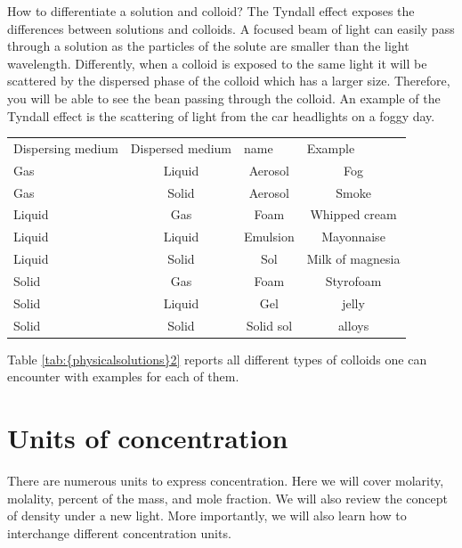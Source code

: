 \documentclass[main.tex]{subfiles}
\newcommand\chapterlabel{physicalsolutions}
\begin{document}
\begin{description}
How to differentiate a solution and colloid? The Tyndall effect exposes the differences between solutions and colloids. A focused beam of light can easily pass through a solution as the particles of the solute are smaller than the light wavelength. Differently, when a colloid is exposed to the same light it will be scattered by the dispersed phase of the colloid which has a larger size. Therefore, you will be able to see the bean passing through the colloid. An example of the Tyndall effect is the scattering of light from the car headlights on a foggy day.
 \begin{center}
  \label{tab:{\chapterlabel}2}
\selectfont
\begin{tabular}{llll}
\rowcolor{black!45}
\toprule
\multicolumn{4}{l}{\hypersetup{colorlinks,linkcolor={white}} \cellcolor{black}\color{white}\bfseries\small Table \ref{tab:{\chapterlabel}2} Types of colloids } \\
\midrule
 \rowcolor{gray!10} Dispersing medium & Dispersed medium& name & Example\\
\midrule
Gas	& \multicolumn{1}{c}{Liquid}&\multicolumn{1}{c}{Aerosol} &\multicolumn{1}{c}{Fog} \\ 
 Gas	& \multicolumn{1}{c}{Solid}&\multicolumn{1}{c}{Aerosol} &\multicolumn{1}{c}{Smoke} \\ 
Liquid	& \multicolumn{1}{c}{Gas}&\multicolumn{1}{c}{Foam} &\multicolumn{1}{c}{Whipped cream} \\ 
Liquid	& \multicolumn{1}{c}{Liquid}&\multicolumn{1}{c}{Emulsion} &\multicolumn{1}{c}{Mayonnaise} \\ 
Liquid	& \multicolumn{1}{c}{Solid}&\multicolumn{1}{c}{Sol} &\multicolumn{1}{c}{Milk of magnesia} \\ 
Solid	& \multicolumn{1}{c}{Gas}&\multicolumn{1}{c}{Foam} &\multicolumn{1}{c}{Styrofoam} \\ 
Solid	& \multicolumn{1}{c}{Liquid}&\multicolumn{1}{c}{Gel} &\multicolumn{1}{c}{jelly} \\ 
Solid	& \multicolumn{1}{c}{Solid}&\multicolumn{1}{c}{Solid sol} &\multicolumn{1}{c}{alloys} \\ 

 \bottomrule
\end{tabular}\end{center} 
Table \ref{tab:{\chapterlabel}2} reports all different types of colloids one can encounter with examples for each of them.
\end{description}


\section{Units of concentration}
There are numerous units to express concentration. Here we will cover molarity, molality, percent of the mass, and mole fraction. We will also review the concept of density under a new light. More importantly, we will also learn how to interchange different concentration units.
\end{document}
